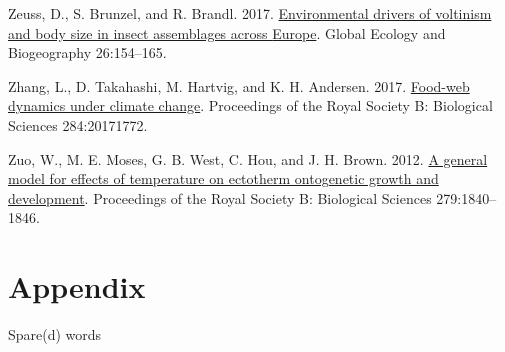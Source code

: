 \documentclass[
]{article}
\newlength{\cslhangindent}
\newlength{\cslentryspacingunit} %
\newenvironment{CSLReferences}[2] %
 {%
  \setlength{\parindent}{0pt}
  \ifodd #1
  \let\oldpar\par
  \def\par{\hangindent=\cslhangindent\oldpar}
  \fi
  \setlength{\parskip}{#2\cslentryspacingunit}
 }%
 {}
\begin{document}
\begin{CSLReferences}{1}{0}
\leavevmode{}%
Zeuss, D., S. Brunzel, and R. Brandl. 2017.
\href{https://doi.org/10.1111/geb.12525}{Environmental drivers of
voltinism and body size in insect assemblages across {Europe}}. Global
Ecology and Biogeography 26:154--165.

\leavevmode{}%
Zhang, L., D. Takahashi, M. Hartvig, and K. H. Andersen. 2017.
\href{https://doi.org/10.1098/rspb.2017.1772}{Food-web dynamics under
climate change}. Proceedings of the Royal Society B: Biological Sciences
284:20171772.

\leavevmode{}%
Zuo, W., M. E. Moses, G. B. West, C. Hou, and J. H. Brown. 2012.
\href{https://doi.org/10.1098/rspb.2011.2000}{A general model for
effects of temperature on ectotherm ontogenetic growth and development}.
Proceedings of the Royal Society B: Biological Sciences 279:1840--1846.

\end{CSLReferences}

\hypertarget{appendix}{%
\section{Appendix}\label{appendix}}

Spare(d) words
\end{document}
